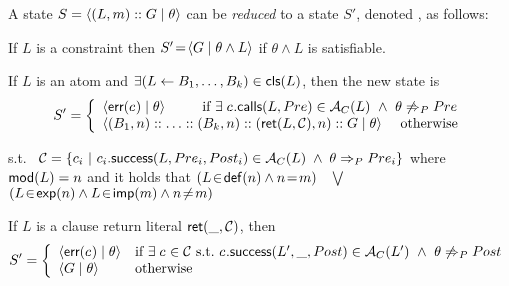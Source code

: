 \documentclass{llncs}
\newcommand{\finalcompression}[1]{\vspace*{#1}}
\begin{document}
\begin{definition}
%
A state $S = \langle (L,m)::G \mid{} \theta \rangle$ %
can be
\emph{reduced} to a state $S'$,
denoted ,
as follows:

\finalcompression{-2mm}
\begin{shortenumerate}
  \item If $L$ is a constraint then %
    $S'\!=\!\langle G \mid{} \theta \land L \rangle$
    if $\theta \land L$ is satisfiable.
  \item
    \label{item:semassrttwo}
    If $L$ is an atom and
    $\exists (L \leftarrow B_1, \ldots, B_k) \in \mathsf{cls}(L)$,
    then the new state is %
    \finalcompression{-2mm}
          \[
        S' = \left\{
        \begin{array}{l}
          \state{\errchk{}}{\theta}
          \textrm{~~~~~~~~if } \exists \;
          \labCallsAsr{}{L}{Pre} \in \AC(L)
          ~\land~ \theta \not\Rightarrow_P Pre %
        \\
          \state{(B_1,n)::\ldots::(B_k,n)::(\retchk{L}{\mathcal{C}},n)::G}{\theta}
          \textrm{~~~~otherwise}
        \end{array}
        \right.
     \]

     \finalcompression{-2mm}
          s.t.\
     $\mathcal{C} = \{ c_{i} ~|~ \textsf{\ensuremath{c_{i}}.success}(L,Pre_i,Post_i)
     \in {\cal A}_{C}(L) \;\land\; \theta \Rightarrow_P Pre_i \}$
     where $\mathsf{mod}(L)=n$ and it holds that
          $(L\!\in\!\mathsf{def}(n) \land n\!=\!m)$%
          ~$\bigvee$~%
          $(L\!\in\!\mathsf{exp}(n) \land L\!\in\!\mathsf{imp}(m) \land n\!\neq\!m)$
  \item
    \label{item:semassrtthree}
    If $L$ is a clause return literal $\textsf{ret}(\_,\mathcal{C})$, then
    \finalcompression{-2mm}
        \[
      S' = \left\{
      \begin{array}{ll}
        \state{\errchk{}}{\theta}
      &
        \textrm{if}~ \exists\; \asrId{} \in \mathcal{C}
        \textrm{~s.t.~} \labSuccessAsr{}{L'}{\_}{Post} \in \AC(L')
        ~\land~ \theta \not\Rightarrow_P Post %
      \\
         \state{G}{\theta}
      &
        \textrm{otherwise}
      \end{array}
      \right.
    \]
  \end{shortenumerate}
\end{definition}
\end{document}
